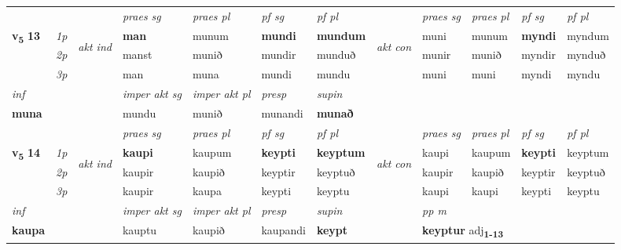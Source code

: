 \begin{longtable}[l]{X>{\footnotesize\itshape}llXXXXlXXXX}
\midrule

 & &   & \textit{praes sg}  & \textit{praes pl}    & \textit{ pf sg} & \textit{pf pl} & & \textit{praes sg}  & \textit{praes pl}    & \textit{pf sg} & \textit{pf pl }  \\ \cmidrule{4-7} \cmidrule{9-12}
 \multirow{2}{*}{{{\textbf{v{\textsubscript{5}}} \Large{\textbf{13}}}}}  & 1p & \multirow{3}{*}{\begin{turn}{90}\textit{akt ind}\end{turn}} & \textbf{man} & munum & \textbf{mundi} & \textbf{mundum} & \multirow{3}{*}{\begin{turn}{90}\textit{akt con}\end{turn}} &muni & munum & \textbf{myndi} & myndum\\*
 & 2p &  &  manst  & munið & mundir & munduð & & munir & munið & myndir & mynduð \\*
 & 3p &  & man & muna & mundi & mundu & & muni & muni& myndi & myndu \\*
\cmidrule{4-7} \cmidrule{9-12}

   {\textit{inf}} & &  & \textit{imper akt sg} & \textit{imper akt pl}   & \textit{presp} & \textit{supin}   \\*
  {\textbf{muna}} & && mundu  & munið   & munandi &  \textbf{munað}   \\*

\midrule

 & &   & \textit{praes sg}  & \textit{praes pl}    & \textit{ pf sg} & \textit{pf pl} & & \textit{praes sg}  & \textit{praes pl}    & \textit{pf sg} & \textit{pf pl }  \\ \cmidrule{4-7} \cmidrule{9-12}
 \multirow{2}{*}{{{\textbf{v{\textsubscript{5}}} \Large{\textbf{14}}}}}  & 1p & \multirow{3}{*}{\begin{turn}{90}\textit{akt ind}\end{turn}} & \textbf{kaupi} & kaupum & \textbf{keypti} & \textbf{keyptum} & \multirow{3}{*}{\begin{turn}{90}\textit{akt con}\end{turn}} &kaupi & kaupum & \textbf{keypti} & keyptum\\*
 & 2p &  &  kaupir  & kaupið & keyptir & keyptuð & & kaupir & kaupið & keyptir & keyptuð \\*
 & 3p &  & kaupir & kaupa & keypti & keyptu & & kaupi & kaupi& keypti & keyptu \\*
\cmidrule{4-7} \cmidrule{9-12}

   {\textit{inf}} & &  & \textit{imper akt sg} & \textit{imper akt pl}   & \textit{presp} & \textit{supin}  && \textit{pp m} \\*
  {\textbf{kaupa}} & && kauptu  & kaupið   & kaupandi &  \textbf{keypt}  && \multicolumn{2}{l}{\textbf{keyptur} adj\textbf{\textsubscript{1-13}}} \\*


\end{longtable}

